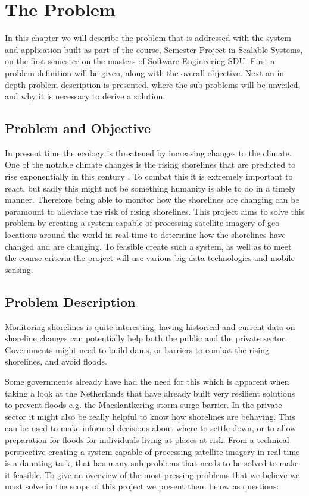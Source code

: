 \chapter{The Problem}

In this chapter we will describe the problem that is addressed with the system and application built as part of the course, Semester Project in Scalable Systems, on the first semester on the masters of Software Engineering SDU. \medbreak
\noindent
First a problem definition will be given, along with the overall objective. Next an in depth problem description is presented, where the sub problems will be unveiled, and why it is necessary to derive a solution.

\section{Problem and Objective}

In present time the ecology is threatened by increasing changes to the climate. One of the notable climate changes is the rising shorelines that are predicted to rise exponentially in this century . To combat this it is extremely important to react, but sadly this might not be something humanity is able to do in a timely manner. Therefore being able to monitor how the shorelines are changing can be paramount to alleviate the risk of rising shorelines. \medbreak 
\noindent
This project aims to solve this problem by creating a system capable of processing satellite imagery of geo locations around the world in real-time to determine how the shorelines have changed and are changing. \medbreak 
\noindent
To feasible create such a system, as well as to meet the course criteria the project will use various big data technologies and mobile sensing.

\section{Problem Description} 

Monitoring shorelines is quite interesting; having historical and current data on shoreline changes can potentially help both the public and the private sector.  \medbreak 
\noindent
Governments might need to build dams, or barriers to combat the rising shorelines, and avoid floods. 

Some governments already have had the need for this which is apparent when taking a look at the Netherlands that have already built very resilient solutions to prevent floods e.g. the Maeslantkering storm surge barrier.   \medbreak 
\noindent
In the private sector it might also be really helpful to know how shorelines are behaving. This can be used to make informed decisions about where to settle down, or to allow preparation for floods for individuals living at places at risk.  \medbreak 
\noindent
From a technical perspective creating a system capable of processing satellite imagery in real-time is a daunting task, that has many sub-problems that needs to be solved to make it feasible.
To give an overview of the most pressing problems that we believe we must solve in the scope of this project we present them below as questions:

